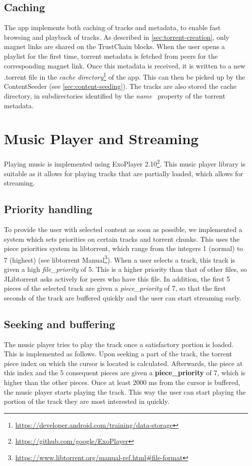 \subsection{Caching}
The app implements both caching of tracks and metadata, to enable fast browsing and playback of tracks. As described in \ref{sec:torrent-creation}, only magnet links are shared on the TrustChain blocks. When the user opens a playlist for the first time, torrent metadata is fetched from peers for the corresponding magnet link. Once this metadata is received, it is written to a new .torrent file in the \textit{cache directory}\footnote{\url{https://developer.android.com/training/data-storage}} of the app. This can then be picked up by the ContentSeeder (see \ref{sec:content-seeding}). The tracks are also stored the cache directory, in subdirectories identified by the \textit{name}~\citep{bittorrentbep3} property of the torrent metadata.

\section{Music Player and Streaming}
Playing music is implemented using ExoPlayer 2.10\footnote{\url{https://github.com/google/ExoPlayer}}. This music player library is suitable as it allows for playing tracks that are partially loaded, which allows for streaming.
\subsection{Priority handling}
To provide the user with selected content as soon as possible, we implemented a system which sets priorities on certain tracks and torrent chunks. This uses the piece priorities system in libtorrent, which range from the integers 1 (normal) to 7 (highest) (see libtorrent Manual\footnote{\url{https://www.libtorrent.org/manual-ref.html\#file-format}}). When a user selects a track, this track is given a high \textit{file\_priority} of 5. This is a higher priority than that of other files, so JLibtorrent asks actively for peers who have this file. In addition, the first 5  pieces of the selected track are given a \textit{piece\_priority} of 7, so that the first seconds of the track are buffered quickly and the user can start streaming early.
\subsection{Seeking and buffering}
The music player tries to play the track once a satisfactory portion is loaded. This is implemented as follows. Upon seeking a part of the track, the torrent piece index on which the cursor is located is calculated. Afterwards, the piece at this index and the 5 consequent pieces are given a \textbf{piece\_priority} of 7, which is higher than the other pieces. Once at least 2000 ms from the cursor is buffered, the music player starts playing the track. This way the user can start playing the portion of the track they are most interested in quickly.
